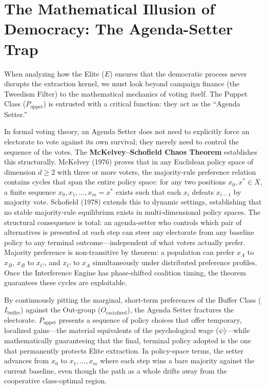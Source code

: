 \section{The Mathematical Illusion of Democracy: The Agenda-Setter Trap}

When analyzing how the Elite ($E$) ensures that the democratic process never disrupts the extraction kernel, we must look beyond campaign finance (the Tweedism Filter) to the mathematical mechanics of voting itself. The Puppet Class ($P_{\text{uppet}}$) is entrusted with a critical function: they act as the ``Agenda Setter.''

In formal voting theory, an Agenda Setter does not need to explicitly force an electorate to vote against its own survival; they merely need to control the sequence of the votes. The \textbf{McKelvey--Schofield Chaos Theorem} \cite{mckelvey1976, schofield1978} establishes this structurally. McKelvey (1976) proves that in any Euclidean policy space of dimension $d \geq 2$ with three or more voters, the majority-rule preference relation contains cycles that span the entire policy space: for any two positions $x_0, x^* \in X$, a finite sequence $x_0, x_1, \ldots, x_m = x^*$ exists such that each $x_i$ defeats $x_{i-1}$ by majority vote. Schofield (1978) extends this to dynamic settings, establishing that no stable majority-rule equilibrium exists in multi-dimensional policy spaces. The structural consequence is total: an agenda-setter who controls which pair of alternatives is presented at each step can steer any electorate from any baseline policy to any terminal outcome---independent of what voters actually prefer. Majority preference is non-transitive by theorem: a population can prefer $x_A$ to $x_B$, $x_B$ to $x_C$, and $x_C$ to $x_A$ simultaneously under distributed preference profiles. Once the Interference Engine has phase-shifted coalition timing, the theorem guarantees these cycles are exploitable.

By continuously pitting the marginal, short-term preferences of the Buffer Class ($I_{\text{buffer}}$) against the Out-group ($O_{\text{racialized}}$), the Agenda Setter fractures the electorate. $P_{\text{uppet}}$ presents a sequence of policy choices that offer temporary, localized gains---the material equivalents of the psychological wage ($\psi$)---while mathematically guaranteeing that the final, terminal policy adopted is the one that permanently protects Elite extraction. In policy-space terms, the setter advances from $x_0$ to $x_1,\ldots,x_m$ where each step wins a bare majority against the current baseline, even though the path as a whole drifts away from the cooperative class-optimal region.


